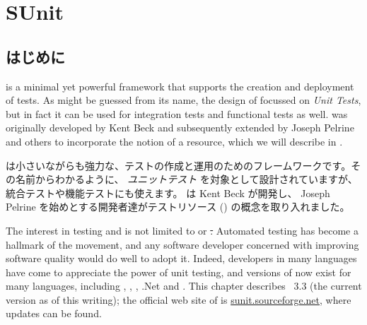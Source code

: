 \documentclass[a4paper,10pt,twoside]{book}
\begin{document}
	\sloppy
\fi
\chapter{SUnit}


\section{はじめに}


 is a minimal yet powerful framework that supports the
creation and deployment of tests.
As might be guessed from its name, the design of \sunit focussed on \emph{Unit Tests}, 
but in fact it can be used for integration tests and functional tests as well.
\sunit was
originally developed by Kent Beck and subsequently extended by Joseph
Pelrine and others to incorporate the
notion of a resource, which we will describe in .
\fi

 は小さいながらも強力な、テストの作成と運用のためのフレームワークです。その名前からわかるように、 \emph{ユニットテスト} を対象として設計されていますが、統合テストや機能テストにも使えます。 \sunit は Kent Beck が開発し、 Joseph Pelrine を始めとする開発者達がテストリソース () の概念を取り入れました。


The interest in testing and 
is not limited to \pharo or \st.  
Automated testing has become a hallmark of the  movement, and any
software developer concerned with improving software quality would do well to adopt it.
Indeed, developers in many languages have come to appreciate
the power of unit testing, and versions of
\xUnit{}  now exist for many languages, including , , , .Net and .
This chapter describes \SUnit~3.3 (the current version as of this writing); the official web site of \sunit is
\url{sunit.sourceforge.net}, where updates can be found.
\fi
\end{document}

